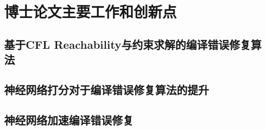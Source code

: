 

\chapter{博士论文主要工作和创新点}

\section{基于CFL Reachability与约束求解的编译错误修复算法}

\section{神经网络打分对于编译错误修复算法的提升}

\section{神经网络加速编译错误修复}
